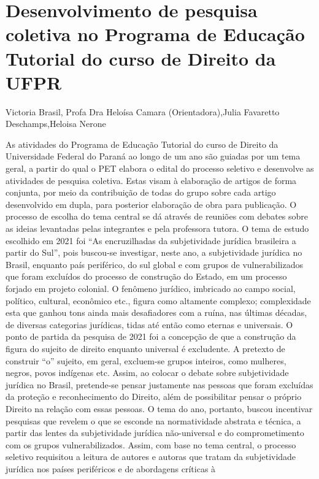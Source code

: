 

\section{Desenvolvimento de pesquisa coletiva no Programa de Educação Tutorial do curso de Direito da UFPR}

Victoria Brasil, Profa Dra Heloísa Camara (Orientadora),Julia Favaretto Deschamps,Heloisa Nerone

As atividades do Programa de Educação Tutorial do curso de Direito da Universidade
Federal do Paraná ao longo de um ano são guiadas por um tema geral, a partir do qual o PET
elabora o edital do processo seletivo e desenvolve as atividades de pesquisa coletiva. Estas visam
à elaboração de artigos de forma conjunta, por meio da contribuição de todas do grupo sobre
cada artigo desenvolvido em dupla, para posterior elaboração de obra para publicação. O
processo de escolha do tema central se dá através de reuniões com debates sobre as ideias
levantadas pelas integrantes e pela professora tutora.
O tema de estudo escolhido em 2021 foi “As encruzilhadas da subjetividade jurídica
brasileira a partir do Sul”, pois buscou-se investigar, neste ano, a subjetividade jurídica no Brasil,
enquanto país periférico, do sul global e com grupos de vulnerabilizados que foram excluídos do
processo de construção do Estado, em um processo forjado em projeto colonial.
O fenômeno jurídico, imbricado ao campo social, político, cultural, econômico etc.,
figura como altamente complexo; complexidade esta que ganhou tons ainda mais desafiadores
com a ruína, nas últimas décadas, de diversas categorias jurídicas, tidas até então como eternas e
universais. O ponto de partida da pesquisa de 2021 foi a concepção de que a construção da figura
do sujeito de direito enquanto universal é excludente. A pretexto de construir “o” sujeito, em
geral, excluem-se grupos inteiros, como mulheres, negros, povos indígenas etc. Assim, ao
colocar o debate sobre subjetividade jurídica no Brasil, pretende-se pensar justamente nas
pessoas que foram excluídas da proteção e reconhecimento do Direito, além de possibilitar
pensar o próprio Direito na relação com essas pessoas. O tema do ano, portanto, buscou
incentivar pesquisas que revelem o que se esconde na normatividade abstrata e técnica, a partir
das lentes da subjetividade jurídica não-universal e do comprometimento com os grupos
vulnerabilizados.
Assim, com base no tema central, o processo seletivo requisitou a leitura de autores e
autoras que tratam da subjetividade jurídica nos países periféricos e de abordagens críticas à
